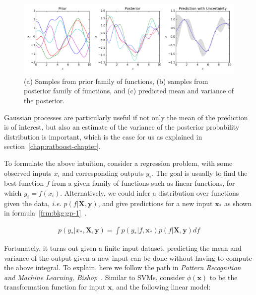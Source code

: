 \begin{figure}[!ht]
  \centering
  \includegraphics[width=1\textwidth]{figs/background/Gaussian_Process_Regression}
  \caption[(a) Samples from prior family of functions, (b) samples from posterior family of functions, and (c) predicted mean and variance]{(a) Samples from prior family of functions, (b) samples from posterior family of functions, and (c) predicted mean and variance of the posterior\protect\footnotemark.}
  \label{fig:bkg:gp-intro}
\end{figure}

Gaussian processes are particularly useful if not only the mean of the prediction is of interest, but also an estimate of the variance of the posterior probability distribution is important, which is the case for us as explained in section~\ref{chap:ratboost-chapter}.

To formulate the above intuition, consider a regression problem, with some observed inputs $x_i$ and corresponding outputs $y_i$. The goal is usually to find the best function $f$ from a given family of functions such as linear functions, for which $y_i = f(x_i)$. Alternatively, we could infer a distribution over functions given the data, \emph{i.e.} $p(f|\mathbf{X}, \mathbf{y})$, and give predictions for a new input $\mathbf{x}_*$ as shown in formula~\ref{frm:bkg:gp-1}~\cite{murphy2012machine}.

\begin{align}
  p(y_*|x_*,\mathbf{X}, \mathbf{y}) = \int p(y_*|f, \mathbf{x_*})p(f|\mathbf{X}, \mathbf{y})df
  \label{frm:bkg:gp-1}
\end{align}

Fortunately, it turns out given a finite input dataset, predicting the mean and variance of the output given a new input can be done without having to compute the above integral. To explain, here we follow the path in \emph{Pattern Recognition and Machine Learning, Bishop}~\cite{bishop2006pattern}. Similar to SVMs, consider $\phi(\mathbf{x})$ to be the transformation function for input $\mathbf{x}$, and the following linear model:

